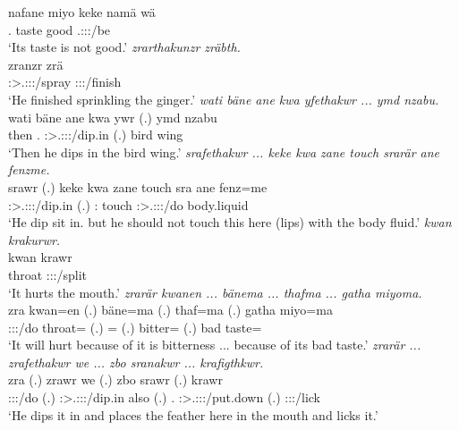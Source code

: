 \begin{exe}
	\gll nafane miyo keke namä wä\\
	\Sg.\Poss{} taste \Neg{} good \Tsg.\Masc:\Io:\Nonpast:\Ipfv/be\\
	\trans `Its taste is not good.'
	\emph{zrarthakunzr zräbth.}\\
	\gll zranzr zrä\\
	\Stsg:\Sbj>\Tsg.\F:\Obj:\Irr:\Ipfv/spray \Stsg:\Sbj:\Irr:\Pfv/finish\\
	\trans `He finished sprinkling the ginger.'
	\emph{wati bäne ane kwa yfethakwr ... ymd nzabu.}\\
	\gll wati bäne ane kwa ywr (.) ymd nzabu\\
	then \Recog.\Abs{} \Dem{} \Fut{} \Stsg:\Sbj>\Tsg.\Masc:\Obj:\Nonpast:\Ipfv/dip.in (.) bird wing\\
	\trans `Then he dips in the bird wing.'
	\emph{srafethakwr ... keke kwa zane touch srarär ane fenzme.}\\
	\gll srawr (.) keke kwa zane touch sra ane fenz=me\\
	\Stsg:\Sbj>\Tsg.\Masc:\Obj:\Irr:\Ipfv/dip.in (.) \Neg{} \Fut{} \Dem:\Prox{} touch \Stsg:\Sbj>\Tsg.\Masc:\Io:\Irr:\Ipfv/do \Dem{} body.liquid\\
	\trans `He dip sit in. but he should not touch this here (lips) with the body fluid.'
	\emph{kwan krakurwr.}\\
	\gll kwan krawr\\
	throat \Stsg:\Sbj:\Irr:\Ipfv/split\\
	\trans `It hurts the mouth.'
	\emph{zrarär kwanen ... bänema ... thafma ... gatha miyoma.}\\
	\gll zra kwan=en (.) bäne=ma (.) thaf=ma (.) gatha miyo=ma\\
	\Stsg:\Sbj:\Irr:\Ipfv/do throat=\Loc{} (.) \Recog=\Char{} (.) bitter=\Char{} (.) bad taste=\Char\\
	\trans `It will hurt because of it is bitterness ... because of its bad taste.'
	\emph{zrarär ... zrafethakwr we ... zbo sranakwr ... krafigthkwr.}\\
	\gll zra (.) zrawr we (.) zbo srawr (.) krawr\\
	\Stsg:\Sbj:\Irr:\Ipfv/do (.) \Stsg:\Sbj>\Tsg.\F:\Obj:\Irr:\Ipfv/dip.in also (.) \Prox.\All{} \Stsg:\Sbj>\Tsg.\Masc:\Io:\Irr:\Ipfv/put.down (.) \Stsg:\Sbj:\Irr:\Ipfv/lick\\
	\trans `He dips it in and places the feather here in the mouth and licks it.'

\end{exe}
